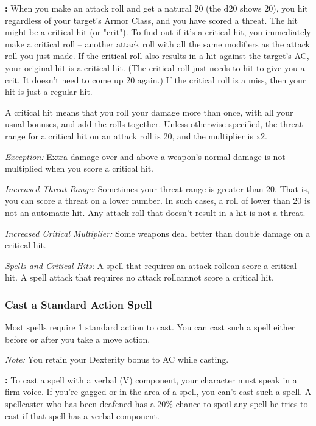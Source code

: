 \textbf{:} When you make an attack roll and get a natural 20 (the d20 shows 20), you hit regardless of your target's Armor Class, and you have scored a threat. The hit might be a critical hit (or "crit"). To find out if it's a critical hit, you immediately make a critical roll -- another attack roll with all the same modifiers as the attack roll you just made. If the critical roll also results in a hit against the target's AC, your original hit is a critical hit. (The critical roll just needs to hit to give you a crit. It doesn't need to come up 20 again.) If the critical roll is a miss, then your hit is just a regular hit.

A critical hit means that you roll your damage more than once, with all your usual bonuses, and add the rolls together. Unless otherwise specified, the threat range for a critical hit on an attack roll is 20, and the multiplier is x2.

\textit{Exception:} Extra damage over and above a weapon's normal damage is not multiplied when you score a critical hit.

\textit{Increased Threat Range:} Sometimes your threat range is greater than 20. That is, you can score a threat on a lower number. In such cases, a roll of lower than 20 is not an automatic hit. Any attack roll that doesn't result in a hit is not a threat.

\textit{Increased Critical Multiplier:} Some weapons deal better than double damage on a critical hit.

\textit{Spells and Critical Hits:} A spell that requires an attack rollcan score a critical hit. A spell attack that requires no attack rollcannot score a critical hit.

\subsubsection{Cast a Standard Action Spell}

Most spells require 1 standard action to cast. You can cast such a spell either before or after you take a move action. 

\textit{Note:} You retain your Dexterity bonus to AC while casting.

\textbf{:} To cast a spell with a verbal (V) component, your character must speak in a firm voice. If you're gagged or in the area of a spell, you can't cast such a spell. A spellcaster who has been deafened has a 20\% chance to spoil any spell he tries to cast if that spell has a verbal component.

